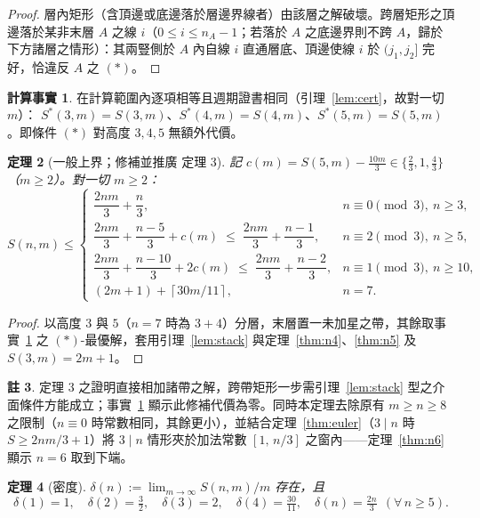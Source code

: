 \documentclass[11pt]{ctexart}
\newtheorem{theorem}{定理}[section]
\theoremstyle{definition}
\newtheorem{remark}[theorem]{註}
\newtheorem{fact}[theorem]{計算事實}
\newcommand{\ceil}[1]{\left\lceil #1 \right\rceil}
\begin{document}
\begin{proof}
層內矩形（含頂邊或底邊落於層邊界線者）由該層之解破壞。跨層矩形之頂邊落於某非末層 $A$ 之線 $i$（$0\le i\le n_A-1$；若落於 $A$ 之底邊界則不跨 $A$，歸於下方諸層之情形）：其兩豎側於 $A$ 內自線 $i$ 直通層底、頂邊使線 $i$ 於 $(j_1,j_2]$ 完好，恰違反 $A$ 之 $(*)$。
\end{proof}

\begin{fact}\label{fact:star}
在計算範圍內逐項相等且週期證書相同（引理~\ref{lem:cert}，故對一切 $m$）：
$S^{*}(3,m)=S(3,m)$、$S^{*}(4,m)=S(4,m)$、$S^{*}(5,m)=S(5,m)$。即條件 $(*)$ 對高度 $3,4,5$ 無額外代價。
\end{fact}

\begin{theorem}[一般上界；修補並推廣 \cite{NT25} 定理 3]\label{thm:general}
記 $c(m)=S(5,m)-\tfrac{10m}{3}\in\{\tfrac23,1,\tfrac43\}$（$m\ge2$）。對一切 $m\ge2$：
\[
S(n,m)\le
\begin{cases}
\dfrac{2nm}{3}+\dfrac n3, & n\equiv0\pmod3,\ n\ge3,\\[4pt]
\dfrac{2nm}{3}+\dfrac{n-5}{3}+c(m)\;\le\;\dfrac{2nm}3+\dfrac{n-1}3, & n\equiv2\pmod3,\ n\ge5,\\[4pt]
\dfrac{2nm}{3}+\dfrac{n-10}{3}+2c(m)\;\le\;\dfrac{2nm}3+\dfrac{n-2}3, & n\equiv1\pmod3,\ n\ge10,\\[4pt]
(2m+1)+\ceil{30m/11}, & n=7 .
\end{cases}
\]
\end{theorem}

\begin{proof}
以高度 $3$ 與 $5$（$n=7$ 時為 $3+4$）分層，末層置一未加星之帶，其餘取事實~\ref{fact:star} 之 $(*)$-最優解，套用引理~\ref{lem:stack} 與定理~\ref{thm:n4}、\ref{thm:n5} 及 $S(3,m)=2m+1$。
\end{proof}

\begin{remark}
\cite{NT25} 定理 3 之證明直接相加諸帶之解，跨帶矩形一步需引理~\ref{lem:stack} 型之介面條件方能成立；事實~\ref{fact:star} 顯示此修補代價為零。同時本定理去除原有 $m\ge n\ge 8$ 之限制（$n\equiv0$ 時常數相同，其餘更小），並結合定理~\ref{thm:euler}（$3\mid n$ 時 $S\ge 2nm/3+1$）將 $3\mid n$ 情形夾於加法常數 $[1,\,n/3]$ 之窗內——定理~\ref{thm:n6} 顯示 $n=6$ 取到下端。
\end{remark}

\begin{theorem}[密度]\label{thm:density}
$\delta(n):=\lim_{m\to\infty}S(n,m)/m$ 存在，且
\[
\delta(1)=1,\quad\delta(2)=\tfrac32,\quad\delta(3)=2,\quad\delta(4)=\tfrac{30}{11},\quad
\delta(n)=\tfrac{2n}{3}\ \ (\forall\,n\ge5).
\]
\end{theorem}
\end{document}
